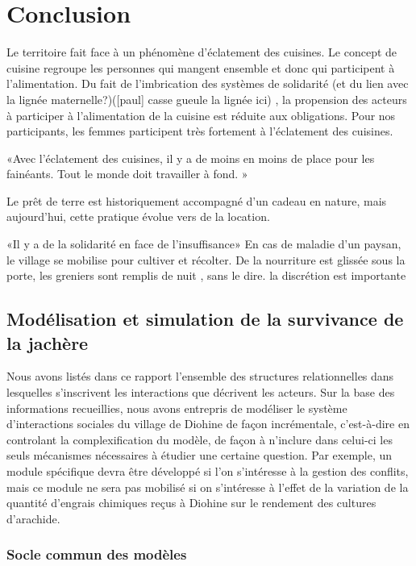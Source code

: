 \chapter{Conclusion}

Le territoire fait face à un phénomène d’éclatement des cuisines. Le concept de cuisine regroupe les personnes qui mangent ensemble et donc qui participent à l’alimentation. Du fait de l’imbrication des systèmes de solidarité (et du lien avec la lignée maternelle?)([paul] casse gueule la lignée ici) , la propension des acteurs à participer à l’alimentation de la cuisine est réduite aux obligations. Pour nos participants, les femmes participent très fortement à l’éclatement des cuisines.

«Avec l’éclatement des cuisines, il y a de moins en moins de place pour les fainéants. Tout le monde doit travailler à fond. »


Le prêt de terre est historiquement accompagné d’un cadeau en nature, mais aujourd’hui, cette pratique évolue vers de la location.

«Il y a de la solidarité en face de l’insuffisance»
En cas de maladie d’un paysan, le village se mobilise pour cultiver et récolter.
De la nourriture est glissée sous la porte, les greniers sont remplis de nuit , sans le dire.
la discrétion est importante



\section{Modélisation et simulation de la survivance de la jachère}


Nous avons listés dans ce rapport l'ensemble des structures relationnelles dans lesquelles s'inscrivent les interactions que décrivent les acteurs.    
Sur la base des informations recueillies, nous avons entrepris de modéliser le système d'interactions sociales du village de Diohine de façon incrémentale, c'est-à-dire en controlant la complexification du modèle, de façon à n'inclure dans celui-ci les seuls mécanismes nécessaires à étudier une certaine question. Par exemple, un module spécifique devra être développé si l'on s'intéresse à la gestion des conflits, mais ce module ne sera pas mobilisé  si on s'intéresse à l'effet de la variation de la quantité d'engrais chimiques reçus à Diohine sur le rendement des cultures d'arachide.

\subsection{Socle commun des modèles}

